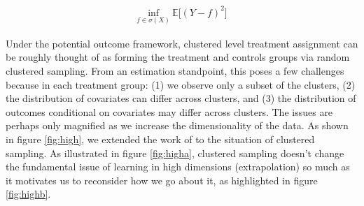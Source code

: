 \documentclass[a4paper,12pt]{article}
\begin{document}
\begin{align*}
    \underset{f \in \sigma(X)}{\textrm{inf}} \ \mathbb{E}\big[(Y-f )^2\big]
\end{align*}
 
Under the potential outcome framework, clustered level treatment assignment can be roughly thought of as forming the treatment and controls groups via random clustered sampling. From an estimation standpoint, this poses a few challenges because in each treatment group: (1) we observe only a subset of the clusters, (2) the distribution of covariates can differ across clusters, and (3) the distribution of outcomes conditional on covariates may differ across clusters. The issues are perhaps only magnified as we increase the dimensionality of the data. As shown in figure \ref{fig:high}, we extended the work of \cite{balestriero2021learning} to the situation of clustered sampling. As illustrated in figure \ref{fig:higha}, clustered sampling doesn't change the fundamental issue of learning in high dimensions  (extrapolation) so much as it motivates us to reconsider how we go about it, as highlighted in figure \ref{fig:highb}.
\end{document}
